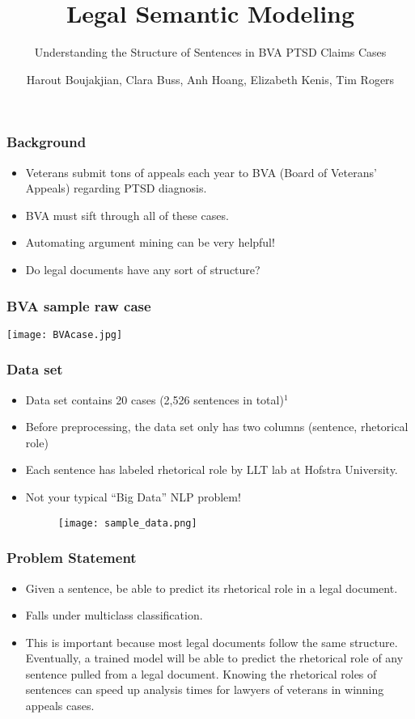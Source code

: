 \documentclass{beamer}
\title{Legal Semantic Modeling}
\subtitle{Understanding the Structure of Sentences in BVA PTSD Claims Cases}
\author{Harout Boujakjian, Clara Buss, Anh Hoang, Elizabeth Kenis, Tim Rogers}
\institute{George Mason University}
\begin{document}
\maketitle


\begin{frame}
  \frametitle{Background}
  \footnotesize
  \begin{itemize}
  \item Veterans submit tons of appeals each year to BVA (Board of Veterans' Appeals) regarding PTSD diagnosis.
  \item BVA must sift through all of these cases.
  \item Automating argument mining can be very helpful!
  \item Do legal documents have any sort of structure?
  \end{itemize}
\end{frame}

\begin{frame}
  \frametitle{BVA sample raw case}
  \centering
  \texttt{[image: BVAcase.jpg]}
\end{frame}

\begin{frame}
  \frametitle{Data set}
  \begin{itemize}
  \item Data set contains 20 cases (2,526 sentences in total)$^1$
  \item Before preprocessing, the data set only has two columns (sentence, rhetorical role)
  \item Each sentence has labeled rhetorical role by LLT lab at Hofstra University.
  \item Not your typical ``Big Data'' NLP problem! 
    \begin{figure}
      \texttt{[image: sample\_data.png]}
    \end{figure}
  \end{itemize}
\end{frame}

\begin{frame}
  \frametitle{Problem Statement}
  \begin{itemize}
  \item Given a sentence, be able to predict its rhetorical role in a legal document.
  \item Falls under multiclass classification.
  \item This is important because most legal documents follow the same structure. Eventually, a trained model will be able to predict the rhetorical role of any sentence pulled from a legal document. Knowing the rhetorical roles of sentences can speed up analysis times for lawyers of veterans in winning appeals cases.
  \end{itemize}
\end{frame}
\end{document}
